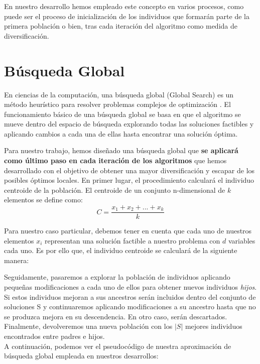 En nuestro desarrollo hemos empleado este concepto en varios procesos, como puede ser el proceso de inicialización de los individuos que formarán parte de la primera población o bien, tras cada iteración del algoritmo como medida de diversificación. 

\section{Búsqueda Global}\label{sec:BG}

En ciencias de la computación, una búsqueda global (Global Search) es un método heurístico para resolver problemas complejos de optimización \cite{GlobalSearch, GlobalSearch2, GlobalSearch3}. %
%
El funcionamiento básico de una búsqueda global se basa en que el algoritmo se mueve dentro del espacio de búsqueda explorando todas las soluciones factibles y aplicando cambios a cada una de ellas hasta encontrar una solución óptima. 

Para nuestro trabajo, hemos diseñado una búsqueda global que \textbf{se aplicará como último paso en cada iteración de los algoritmos} que hemos desarrollado con el objetivo de obtener una mayor diversificación y escapar de los posibles óptimos locales. En primer lugar, el procedimiento calculará el individuo centroide de la población. El centroide de un conjunto n-dimensional de $k$ elementos se define como:
\begin{equation}\label{centroide}
    C = \frac{x_{1} + x_{2} + ... + x_{k}}{k}
\end{equation}

Para nuestro caso particular, debemos tener en cuenta que cada uno de nuestros elementos $x_{i}$ representan una solución factible a nuestro problema con $d$ variables cada uno. Es por ello que, el individuo centroide se calculará de la siguiente manera: 

Seguidamente, pasaremos a explorar la población de individuos aplicando pequeñas modificaciones a cada uno de ellos para obtener nuevos individuos \textit{hijos}. Si estos individuos mejoran a sus ancestros serán incluidos dentro del conjunto de soluciones S y continuaremos aplicando modificaciones a su ancestro hasta que no se produzca mejora en su descendencia. En otro caso, serán descartados.
Finalmente, devolveremos una nueva población con los $|S|$ mejores individuos encontrados entre padres e hijos. \\
A continuación, podemos ver el pseudocódigo de nuestra aproximación de búsqueda global empleada en nuestros desarrollos: 

